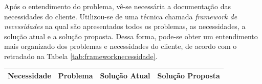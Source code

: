 Após o entendimento do problema, vê-se necessária a documentação das necessidades do cliente. Utilizou-se de uma técnica chamada \textit{framework de necessidades} na qual são apresentados todos os problemas, as necessidades, a solução atual e a solução proposta. Dessa forma, pode-se obter um entendimento mais organizado dos problemas e necessidades do cliente, de acordo com o retradado na Tabela \ref{tab:frameworknecessidade}.

\begin{table}[H]
\centering
\begin{tabular}{|p{5cm}|p{3cm}|p{3cm}|p{5cm}|}

\hline
\textbf{Necessidade} &
\textbf{Problema} &
\textbf{Solução Atual} &
\textbf{Solução Proposta}
\\ \hline


\end{tabular}
\end{table}
